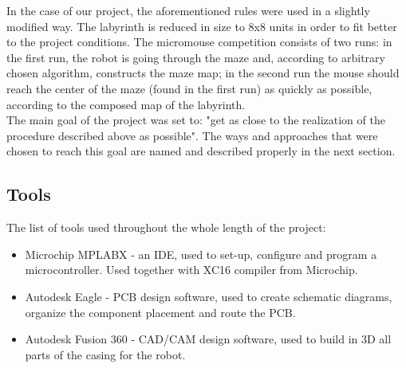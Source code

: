  In the case of our project, the aforementioned rules were used in a slightly modified way. The labyrinth is reduced in size to 8x8 units in order to fit better to the project conditions. The micromouse competition consists of two runs: in the first run, the robot is going through the maze and, according to arbitrary chosen algorithm, constructs the maze map; in the second run the mouse should reach the center of the maze (found in the first run) as quickly as possible, according to the composed map of the labyrinth. \\
 The main goal of the project was set to:  "get as close to the realization of the procedure described above as possible".
 The ways and approaches that were chosen to reach this goal are named and described properly in the next section.
 
 \subsection{Tools}
 
The list of tools used throughout the whole length of the project:
\begin{itemize}
    \item Microchip MPLABX - an IDE, used to set-up, configure and program a microcontroller. Used together with XC16 compiler from Microchip.
    \item Autodesk Eagle - PCB design software, used to create schematic diagrams, organize the component placement and route the PCB.
    \item Autodesk Fusion 360 -  CAD/CAM design software, used to build in 3D all parts of the casing for the robot.
\end{itemize}


